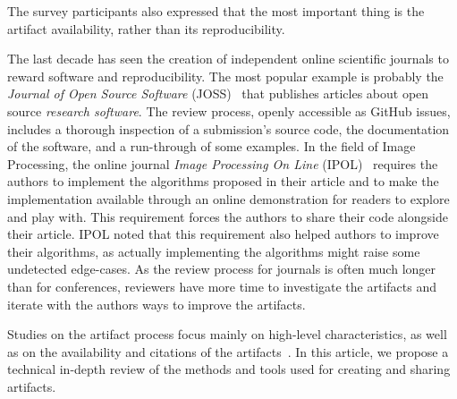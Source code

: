 \documentclass[sigconf,natbib=false]{acmart}
\newcommand{\ad}{Artifact Description}
\newcommand{\aeval}{Artifact Evaluation}
\newcommand{\adae}{\ad/\aeval}
\newcommand{\todo}[1]{{\color{red}{TODO: #1}}}
\begin{document}
The survey participants \cite{hermann2020community} also expressed that the most important thing is the artifact availability, rather than its reproducibility.



The last decade has seen the creation of independent online scientific journals to reward software and reproducibility.
The most popular example is probably the \emph{Journal of Open Source Software} (JOSS)\ \cite{smith2018journal} that publishes articles about open source \emph{research software}.
The review process, openly accessible as GitHub issues, includes a thorough inspection of a submission's source code, the documentation of the software, and a run-through of some examples.
In the field of Image Processing, the online journal \emph{Image Processing On Line} (IPOL)\ \cite{colom2015ipol} requires the authors to implement the algorithms proposed in their article and to make the implementation available through an online demonstration for readers to explore and play with.
This requirement forces the authors to share their code alongside their article.
IPOL noted that this requirement also helped authors to improve their algorithms, as actually implementing the algorithms might raise some undetected edge-cases.
As the review process for journals is often much longer than for conferences, reviewers have more time to investigate the artifacts and iterate with the authors ways to improve the artifacts.



Studies on the artifact process focus mainly on high-level characteristics, as well as on the availability and citations of the artifacts\ \cite{kidwell2016badges, rowhani2017incentives, winter2022retrospective, frachtenberg2022research, heumuller2020publish}. 
In this article, we propose a technical in-depth review of the methods and tools used for creating and sharing artifacts.


%
%
\end{document}
